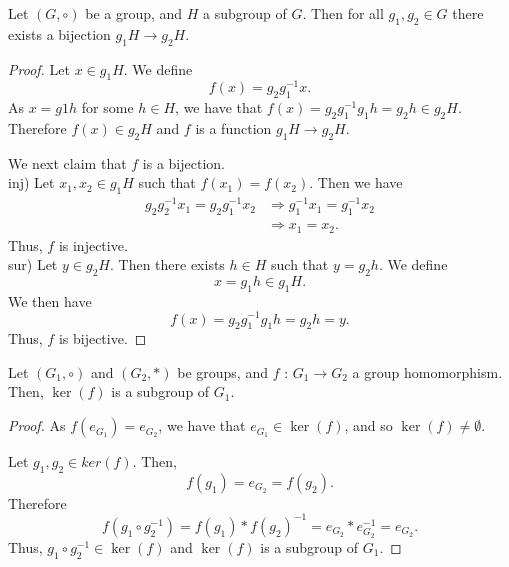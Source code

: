 \documentclass[12pt]{article}
\begin{document}
\begin{theorem}
    Let \((G, \circ)\) be a group, and \(H\) a subgroup of \(G\). Then for all \(g_1, g_2\in G\) there exists a bijection \(g_1H\rightarrow g_2H\). 
\end{theorem}
\begin{proof}
    Let \(x\in g_1H\). We define
    \begin{equation*}
        f(x) = g_2g_1^{-1}x.
    \end{equation*}
    As \(x = g1h\) for some \(h\in H\), we have that \(f(x) = g_2g_1^{-1}g_1h = g_2h\in g_2H\). Therefore \(f(x) \in g_2H\) and \(f\) is a function \(g_1H\rightarrow g_2H\). 

    We next claim that \(f\) is a bijection.\\ 
    inj) Let \(x_1, x_2\in g_1H\) such that \(f(x_1) = f(x_2)\). Then we have
    \begin{equation*}
        \begin{split}
            g_2g_2^{-1}x_1 = g_2g_1^{-1}x_2 &\Longrightarrow g_1^{-1}x_1 = g_1^{-1}x_2\\
            &\Longrightarrow x_1 = x_2. 
        \end{split}
    \end{equation*}
    Thus, \(f\) is injective.\\
    sur) Let \(y \in g_2H\). Then there exists \(h\in H\) such that \(y = g_2h\). We define
    \begin{equation*}
        x = g_1h\in g_1H.
    \end{equation*}
    We then have
    \begin{equation*}
        f(x) = g_2g_1^{-1}g_1h = g_2h = y.
    \end{equation*}
    Thus, \(f\) is bijective.
\end{proof}

\begin{theorem}
    Let \((G_1, \circ)\) and \((G_2, *)\) be groups, and \(f\) : \(G_1 \rightarrow G_2\) a group homomorphism. Then, \(\ker(f)\) is a subgroup of \(G_1\).
\end{theorem}

\begin{proof}
    As \(f(e_{G_1}) = e_{G_2}\), we have that \(e_{G_1}\in \ker(f)\), and so \(\ker(f)\neq \emptyset\). 
    
    Let \(g_1, g_2\in ker(f)\). Then,
    \begin{equation*}
        f(g_1) = e_{G_2} = f(g_2).
    \end{equation*}
    Therefore
    \begin{equation*}
        f(g_1\circ g_2^{-1}) = f(g_1)*f(g_2)^{-1} = e_{G_2} * e_{G_2}^{-1} = e_{G_2}.
    \end{equation*}
    Thus, \(g_1\circ g_2^{-1}\in \ker(f)\) and \(\ker(f)\) is a subgroup of \(G_1\).
\end{proof}
\end{document}

